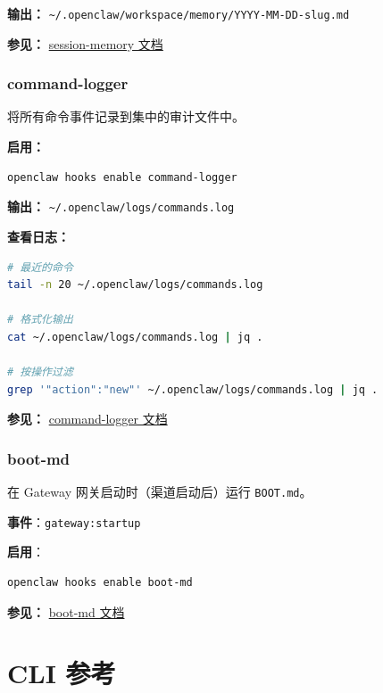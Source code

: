 \textbf{输出：} \texttt{\textasciitilde{}/.openclaw/workspace/memory/YYYY-MM-DD-slug.md}

\textbf{参见：} \href{/automation/hooks\#session-memory}{session-memory 文档}

\subsubsection{command-logger}


将所有命令事件记录到集中的审计文件中。

\textbf{启用：}

\begin{lstlisting}[language=bash]
openclaw hooks enable command-logger
\end{lstlisting}


\textbf{输出：} \texttt{\textasciitilde{}/.openclaw/logs/commands.log}

\textbf{查看日志：}

\begin{lstlisting}[language=bash]
# 最近的命令
tail -n 20 ~/.openclaw/logs/commands.log

# 格式化输出
cat ~/.openclaw/logs/commands.log | jq .

# 按操作过滤
grep '"action":"new"' ~/.openclaw/logs/commands.log | jq .
\end{lstlisting}


\textbf{参见：} \href{/automation/hooks\#command-logger}{command-logger 文档}

\subsubsection{boot-md}


在 Gateway 网关启动时（渠道启动后）运行 \texttt{BOOT.md}。

\textbf{事件}：\texttt{gateway:startup}

\textbf{启用}：

\begin{lstlisting}[language=bash]
openclaw hooks enable boot-md
\end{lstlisting}


\textbf{参见：} \href{/automation/hooks\#boot-md}{boot-md 文档}


\clearpage

\section{CLI 参考}


